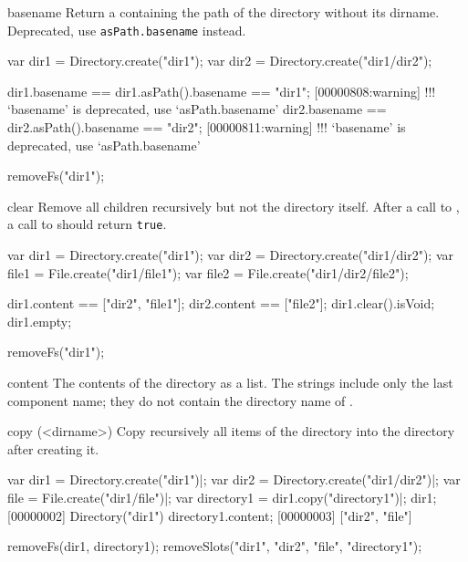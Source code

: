 \begin{urbiscriptapi}
\item[basename] Return a  containing the path of the
  directory without its dirname.  Deprecated, use
  \lstinline|asPath.basename| instead.
\begin{urbiassert}[firstnumber=1]
var dir1 = Directory.create("dir1");
var dir2 = Directory.create("dir1/dir2");

dir1.basename == dir1.asPath().basename == "dir1";
[00000808:warning] !!! `basename' is deprecated, use `asPath.basename'
dir2.basename == dir2.asPath().basename == "dir2";
[00000811:warning] !!! `basename' is deprecated, use `asPath.basename'
\end{urbiassert}
\begin{urbicomment}
removeFs("dir1");
\end{urbicomment}


\item[clear]
  Remove all children recursively but not the directory itself. After a
  call to , a call to  should return
  \lstinline|true|.
\begin{urbiassert}
var dir1 = Directory.create("dir1");
var dir2 = Directory.create("dir1/dir2");
var file1 = File.create("dir1/file1");
var file2 = File.create("dir1/dir2/file2");

dir1.content == ["dir2", "file1"];
dir2.content == ["file2"];
dir1.clear().isVoid;
dir1.empty;
\end{urbiassert}
\begin{urbicomment}
removeFs("dir1");
\end{urbicomment}


\item[content]
  The contents of the directory as a  list.  The
  strings include only the last component name; they do not contain
  the directory name of \this.


\item[copy](<dirname>)
  Copy recursively all items of the \this directory
  into the directory  after creating it.
\begin{urbiscript}
var dir1 = Directory.create("dir1")|;
var dir2 = Directory.create("dir1/dir2")|;
var file = File.create("dir1/file")|;
var directory1 = dir1.copy("directory1")|;
dir1;
[00000002] Directory("dir1")
directory1.content;
[00000003] ["dir2", "file"]
\end{urbiscript}
\begin{urbicomment}
removeFs(dir1, directory1);
removeSlots("dir1", "dir2", "file", "directory1");
\end{urbicomment}



\end{urbiscriptapi}
